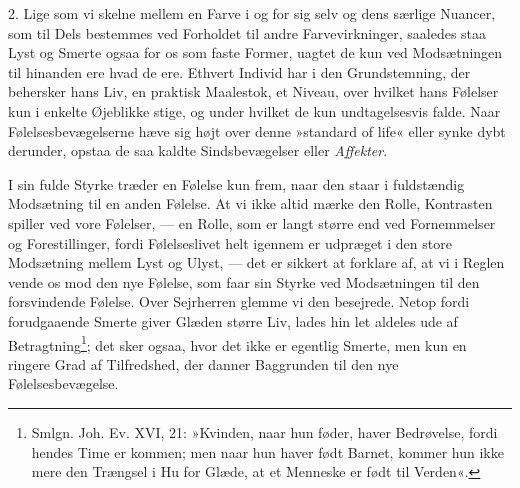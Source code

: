 \documentclass[12pt,a4paper,openany]{book}
\begin{document}
2. Lige som vi skelne mellem en Farve i og for sig selv og dens særlige
Nuancer, som til Dels bestemmes ved Forholdet til andre Farvevirkninger,
saaledes staa Lyst og Smerte ogsaa for os som faste Former, uagtet de
kun ved Modsætningen til hinanden ere hvad de ere. Ethvert Individ har i
den Grundstemning, der behersker hans Liv, en praktisk Maalestok, et
Niveau, over hvilket hans Følelser kun i enkelte Øjeblikke stige, og
under hvilket de kun undtagelsesvis falde. Naar Følelsesbevægelserne
hæve sig højt over denne »standard of life« eller synke dybt derunder,
opstaa de saa kaldte Sindsbevægelser eller \emph{Affekter}.

I sin fulde Styrke træder en Følelse kun frem, naar den staar i
fuldstændig Modsætning til en anden Følelse. At vi ikke altid mærke den
Rolle, Kontrasten spiller ved vore Følelser, --- en Rolle, som er langt
større end ved Fornemmelser og Forestillinger, fordi Følelseslivet helt
igennem er udpræget i den store Modsætning mellem Lyst og Ulyst, --- det
er sikkert at forklare af, at vi i Reglen vende os mod den nye Følelse,
som faar sin Styrke ved Modsætningen til den forsvindende Følelse. Over
Sejrherren glemme vi den besejrede. Netop fordi forudgaaende Smerte
giver Glæden større Liv, lades hin let aldeles ude af
Betragtning\footnote[1]{Smlgn. Joh. Ev. XVI, 21: »Kvinden, naar hun
føder, haver Bedrøvelse, fordi hendes Time er kommen; men naar hun haver
født Barnet, kommer hun ikke mere den Trængsel i Hu for Glæde, at et
Menneske er født til Verden«.}; det sker ogsaa, hvor det ikke er
egentlig Smerte, men kun en ringere Grad af Tilfredshed, der danner
Baggrunden til den nye Følelsesbevægelse.
\end{document}
